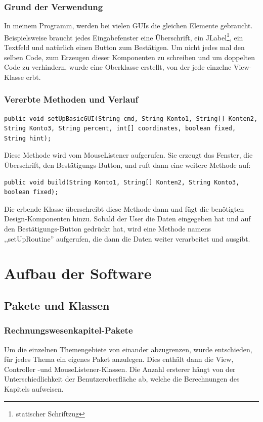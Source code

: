 \documentclass[12pt]{report}
\begin{document}
\subsection{Grund der Verwendung}
In meinem Programm, werden bei vielen GUIs die gleichen Elemente gebraucht. Beispielsweise braucht jedes Eingabefenster eine Überschrift, ein JLabel\footnote{statischer Schriftzug}, ein Textfeld und natürlich einen Button zum Bestätigen. Um nicht jedes mal den selben Code, zum Erzeugen dieser Komponenten zu schreiben und um doppelten Code zu verhindern, wurde eine Oberklasse erstellt, von der jede einzelne View-Klasse erbt. 

\subsection{Vererbte Methoden und Verlauf}

\lstset{language=Java, breaklines=true}
\begin{lstlisting}
public void setUpBasicGUI(String cmd, String Konto1, String[] Konten2, String Konto3, String percent, int[] coordinates, boolean fixed, String hint);
\end{lstlisting}
Diese Methode wird vom MouseListener aufgerufen. Sie erzeugt das Fenster, die Überschrift, den Bestätigungs-Button, und ruft dann eine weitere Methode auf:
\begin{lstlisting}
public void build(String Konto1, String[] Konten2, String Konto3, boolean fixed);
\end{lstlisting}
Die erbende Klasse überschreibt diese Methode dann und fügt die benötigten Design-Komponenten hinzu. Sobald der User die Daten eingegeben hat und auf den Bestätigungs-Button gedrückt hat, wird eine Methode namens ,,setUpRoutine'' aufgerufen, die dann die Daten weiter verarbeitet und ausgibt.


\chapter{Aufbau der Software}

\section{Pakete und Klassen} 
  
  

\subsection{Rechnungswesenkapitel-Pakete}
Um die einzelnen Themengebiete von einander abzugrenzen, wurde entschieden, für jedes Thema ein eigenes Paket anzulegen. Dies enthält dann die View, Controller -und MouseListener-Klassen. Die Anzahl ersterer hängt von der Unterschiedlichkeit der Benutzeroberfläche ab, welche die Berechnungen des Kapitels aufweisen.
\end{document}
